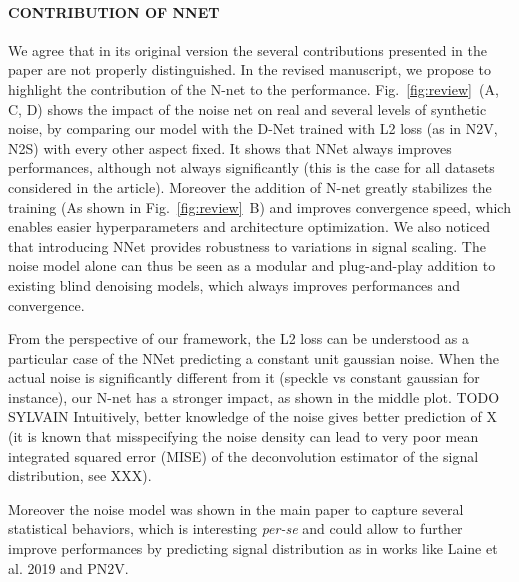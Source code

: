 \documentclass{article}
\begin{document}
\paragraph{CONTRIBUTION OF NNET}
We agree that in its original version the several contributions presented in the paper are not properly distinguished. In the revised manuscript, we propose to highlight the contribution of the N-net to the performance.
Fig.~\ref{fig:review}~(A, C, D) shows the impact of the noise net on real and several levels of synthetic noise, by comparing our model with the D-Net trained with L2 loss (as in N2V, N2S) with every other aspect fixed. It shows that NNet always improves performances, although not always significantly (this is the case for all datasets considered in the article). Moreover the addition of N-net greatly stabilizes the training (As shown in Fig.~\ref{fig:review}~B) and improves convergence speed, which enables easier hyperparameters and architecture optimization. We also noticed that introducing NNet provides robustness to variations in signal scaling. The noise model alone can thus be seen as a modular and plug-and-play addition to existing blind denoising models, which always improves performances and convergence.

From the perspective of our framework, the L2 loss can be understood as a particular case of the NNet predicting a constant unit gaussian noise. When the actual noise is significantly different from it (speckle vs constant gaussian for instance), our N-net has a stronger impact, as shown in the middle plot.
TODO SYLVAIN  Intuitively, better knowledge of the noise gives better prediction of X (it is known that misspecifying the noise density can lead to very poor mean integrated squared error (MISE) of the deconvolution estimator of the signal distribution, see XXX).

Moreover the noise model was shown in the main paper to capture several statistical behaviors, which is interesting \textit{per-se} and could allow to further improve performances by predicting signal distribution as in works like Laine et al. 2019 and PN2V.
\end{document}
